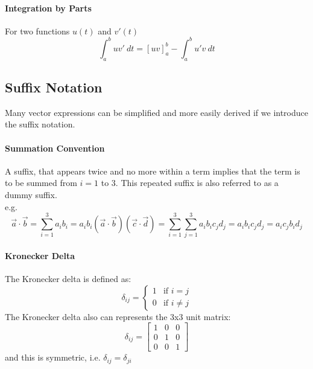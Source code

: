 \documentclass[11pt]{article}
\begin{document}
\paragraph{Integration by Parts}
For two functions $u(t)$ and $v'(t)$
    \begin{equation}
        \label{eq:equation11}
        \int_{a}^{b} uv' \: dt = [uv]_{a}^{b} - \int_{a}^{b} u'v \: dt
    \end{equation}
\subsection{Suffix Notation}\label{subsec:suffix-notation}
Many vector expressions can be simplified and more easily derived if we introduce the suffix notation.
    \paragraph{Summation Convention}
    A suffix, that appears twice and no more within a term implies that the term is to be summed from $i = 1$ to $3$.
    This repeated suffix is also referred to as a dummy suffix.\\
    e.g.
    \begin{subequations}
        \begin{equation}
            \label{eq:equation12}
            \vec{a} \cdot \vec{b} = \sum_{i = 1}^{3} a_{i}b_i = a_{i}b_i
        \end{equation}
        \begin{equation}
            \label{eq:equation13}
            (\vec{a} \cdot \vec{b})(\vec{c} \cdot \vec{d}) = \sum_{i = 1}^{3}\sum_{j = 1}^{3} a_i b_i c_j d_j
            = a_i b_i c_j d_j = a_i c_j b_i d_j
        \end{equation}
    \end{subequations}
    \paragraph{Kronecker Delta}
    The Kronecker delta is defined as:
    \begin{equation}
        \label{eq:equation14}
        \delta_{ij} =
        \begin{cases}
            1 & \text{if $i = j$} \\
            0 & \text{if $i \neq j$}
        \end{cases}
    \end{equation}
    The Kronecker delta also can represents the 3x3 unit matrix:
    \begin{equation}
        \label{eq:equation15}
        \delta_{ij} =
        \begin{bmatrix}
            1 & 0 & 0 \\
            0 & 1 & 0 \\
            0 & 0 & 1
        \end{bmatrix}
    \end{equation}
    and this is symmetric, i.e. $\delta_{ij} = \delta_{ji}$
\end{document}
